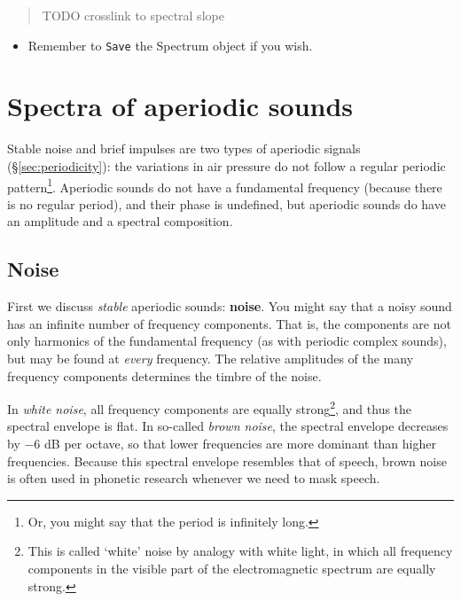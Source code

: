 \documentclass[
]{book}
\providecommand{\tightlist}{%
  \setlength{\itemsep}{0pt}\setlength{\parskip}{0pt}}
\begin{document}
\begin{quote}
TODO crosslink to spectral slope
\end{quote}

\begin{itemize}
\tightlist
\item
  Remember to \texttt{Save} the Spectrum object if you wish.
\end{itemize}

\section{Spectra of aperiodic sounds}\label{spectra-of-aperiodic-sounds}

Stable noise and brief impulses are two types of aperiodic signals (§\ref{sec:periodicity}): the variations in air pressure do not follow a regular periodic pattern\footnote{Or, you might say that the period is infinitely long.}. Aperiodic sounds do not have a fundamental frequency (because there is no regular period), and their phase is undefined, but aperiodic sounds do have an amplitude and a spectral composition.

\subsection{Noise}\label{sec:noise}

First we discuss \emph{stable} aperiodic sounds: \textbf{noise}. You might say that a noisy sound has an infinite number of frequency components. That is, the components are not only harmonics of the fundamental frequency (as with periodic complex sounds), but may be found at \emph{every} frequency. The relative amplitudes of the many frequency components determines the timbre of the noise.

In \emph{white noise}, all frequency components are equally strong\footnote{This is called `white' noise by analogy with white light, in which all frequency components in the visible part of the electromagnetic spectrum are equally strong.}, and thus the spectral envelope is flat.
In so-called \emph{brown noise}, the spectral envelope decreases by \(-6\) dB per octave, so that lower frequencies are more dominant than higher frequencies. Because this spectral envelope resembles that of speech, brown noise is often used in phonetic research whenever we need to mask speech.
\end{document}
